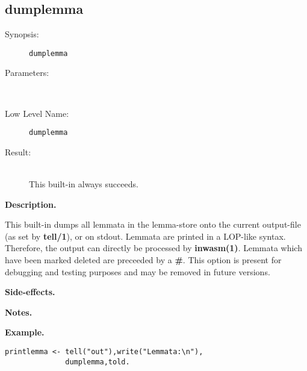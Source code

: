 %
%
%
\subsection{dumplemma}

\begin{description}
\item[Synopsis:]
	{\tt dumplemma}
\item[Parameters:]\ \\[-0.5cm]
\item[Low Level Name:]
	{\tt dumplemma}
\item[Result:]\ \\
This built-in always succeeds.
\end{description}

\vspace*{0.5cm}
\noindent
{\bf Description.}

This built-in dumps all lemmata in the lemma-store
onto the current output-file (as set by {\bf tell/1}), or on
stdout.
Lemmata are printed in a LOP-like syntax. Therefore, the output can directly
be processed by {\bf inwasm(1)}.
Lemmata which have been marked deleted are preceeded by a {\bf \#}.
This option is present for debugging and testing purposes and may
be removed in future versions.
 
\vspace*{0.5cm}
\noindent
{\bf Side-effects.}

\vspace*{0.5cm}
\noindent
{\bf Notes.}

\vspace*{0.5cm}
\noindent
{\bf Example.}
\begin{verbatim}
printlemma <- tell("out"),write("Lemmata:\n"),
              dumplemma,told.

\end{verbatim}


